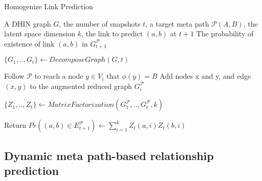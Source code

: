 \begin{algorithm}[t]
\caption{Homogenize Link Prediction}\label{alg1}
\begin{algorithmic}[1]%
\REQUIRE A DHIN graph $G$, the number of snapshots $t$, a target meta path $\mathcal{P}(A,B)$, the latent space dimension $k$, the link to predict $(a,b)$ at $t+1$
\ENSURE The probability of existence of link $(a,b)$ in $G^\mathcal{P}_{t+1}$

\STATE $\{G_1, .., G_t\} \leftarrow DecomposeGraph(G, t)$

    
        \STATE Follow $\mathcal{P}$ to reach a node $y\in V_i$ that $\phi(y)=B$%
        \STATE Add nodes x and y, and edge $(x,y)$ to the augmented reduced graph $G_i^\mathcal{P}$ 
\ENDFOR

\ENDFOR
\STATE $\{Z_1, .., Z_t\} \leftarrow MatrixFactorization(G^\mathcal{P}_1, .., G^\mathcal{P}_t, k)$

\STATE Return $Pr((a,b)\in E^\mathcal{P}_{t+1}) \leftarrow \sum_{i=1}^{k} Z_t(a,i)Z_t(b,i)$


\end{algorithmic}
\end{algorithm}



\subsection{Dynamic meta path-based relationship prediction}

